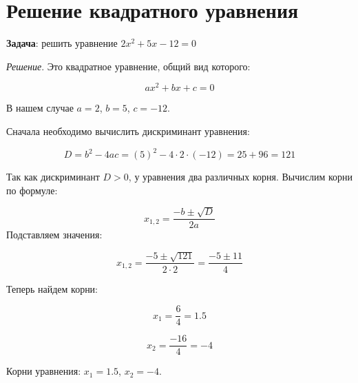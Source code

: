 \documentclass{article}
\begin{document}
\section{Решение квадратного уравнения}

\textbf{Задача}: решить уравнение \( 2x^2 + 5x - 12 = 0 \)

\textit{Решение}. Это квадратное уравнение, общий вид которого:

\[
ax^2 + bx + c = 0
\]

В нашем случае \( a = 2 \), \( b = 5 \), \( c = -12 \).

Сначала необходимо вычислить дискриминант уравнения:


\[
D = b^2 - 4ac = (5)^2 - 4 \cdot 2 \cdot (-12) = 25 + 96 = 121
\]

Так как дискриминант \( D > 0 \), у уравнения два различных корня. Вычислим корни по формуле:


\[
x_{1,2} = \frac{-b \pm \sqrt{D}}{2a}
\]
Подставляем значения:


\[
x_{1,2} = \frac{-5 \pm \sqrt{121}}{2 \cdot 2} = \frac{-5 \pm 11}{4}
\]

Теперь найдем корни:


\[
x_1 = \frac{6}{4} = 1.5
\]


\[
x_2 = \frac{-16}{4} = -4
\]

Корни уравнения: \( x_1 = 1.5 \), \( x_2 = -4 \).
\end{document}
